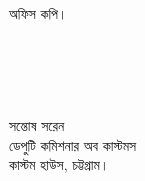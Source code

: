 \documentclass[12pt]{article}
\begin{document}
\begin{minipage}[t]{0.94\linewidth}
 অফিস কপি।
 \\
 \\
 \\
 \\
 \\
\end{minipage}
\begin{minipage}[t]{0.60\linewidth}
\hspace{1em}
\end{minipage}
\normalsize
\begin{minipage}[t]{0.40\linewidth}
\begin{center}
সন্তোষ সরেন
\\
ডেপুটি কমিশনার অব কাস্টমস
\\
কাস্টম হাউস, চট্টগ্রাম।
\end{center}
\end{minipage}
\end{document}
